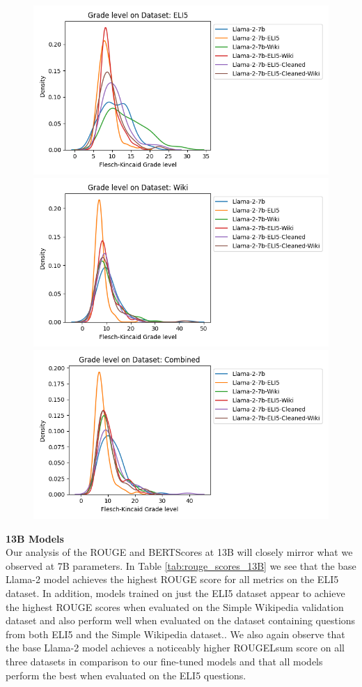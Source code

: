 \documentclass[11pt, oneside]{article}   	%
\begin{document}
\begin{figure}
\includegraphics[scale=.5]{./figures/FKG_7B_ELI5.png}
\\
\includegraphics[scale=.5]{./figures/FKG_7B_Wiki.png}
\includegraphics[scale=.5]{./figures/FKG_7B_full.png}
\end{figure}
\noindent\textbf{13B Models}
\\[10pt]
Our analysis of the ROUGE and BERTScores at 13B will closely mirror what we observed at 7B parameters.
In Table \ref{tab:rouge_scores_13B} we see that the base Llama-2 model achieves the highest ROUGE score for all metrics on the ELI5 dataset. In addition, models trained on just the ELI5 dataset appear to achieve the highest ROUGE scores when evaluated on the Simple Wikipedia validation dataset and also perform well when evaluated on the dataset containing questions from both ELI5 and the Simple Wikipedia dataset..
We also again observe that the base Llama-2 model achieves a noticeably higher ROUGELsum score on all three datasets in comparison to our fine-tuned models and that all models perform the best when evaluated on the ELI5 questions.
\end{document}
